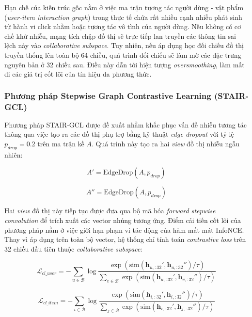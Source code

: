 Hạn chế của kiến trúc gốc nằm ở việc ma trận tương tác người dùng - vật phẩm (\textit{user-item interaction graph}) trong thực tế chứa rất nhiều cạnh nhiễu phát sinh từ hành vi click nhầm hoặc tương tác vô tình của người dùng. Nếu không có cơ chế khử nhiễu, mạng tích chập đồ thị sẽ trực tiếp lan truyền các thông tin sai lệch này vào \textit{collaborative subspace}. Tuy nhiên, nếu áp dụng học đối chiếu đồ thị truyền thống lên toàn bộ 64 chiều, quá trình đối chiếu sẽ làm mờ các đặc trưng nguyên bản ở 32 chiều sau. Điều này dẫn tới hiện tượng \textit{oversmoothing}, làm mất đi các giá trị cốt lõi của tín hiệu đa phương thức.

\subsubsection{Phương pháp Stepwise Graph Contrastive Learning (STAIR-GCL)}

Phương pháp STAIR-GCL được đề xuất nhằm khắc phục vấn đề nhiễu tương tác thông qua việc tạo ra các đồ thị phụ trợ bằng kỹ thuật \textit{edge dropout} với tỷ lệ $p_{drop}=0.2$ trên ma trận kề $A$. Quá trình này tạo ra hai \textit{view} đồ thị nhiễu ngẫu nhiên:

\begin{equation}
A' = \text{EdgeDrop}(A, p_{drop})
\end{equation}

\begin{equation}
A'' = \text{EdgeDrop}(A, p_{drop})
\end{equation}

Hai \textit{view} đồ thị này tiếp tục được đưa qua bộ mã hóa \textit{forward stepwise convolution} để trích xuất các vector nhúng tương ứng. Điểm cải tiến cốt lõi của phương pháp nằm ở việc giới hạn phạm vi tác động của hàm mất mát InfoNCE. Thay vì áp dụng trên toàn bộ vector, hệ thống chỉ tính toán \textit{contrastive loss} trên 32 chiều đầu tiên thuộc \textit{collaborative subspace}:

\begin{equation}
\mathcal{L}_{cl\_user} = -\sum_{u \in \mathcal{B}} \log \frac{\exp(\text{sim}(\mathbf{h}_{u,:32}', \mathbf{h}_{u,:32}'') / \tau)}{\sum_{v \in \mathcal{B}} \exp(\text{sim}(\mathbf{h}_{u,:32}', \mathbf{h}_{v,:32}'') / \tau)}
\end{equation}

\begin{equation}
\mathcal{L}_{cl\_item} = -\sum_{i \in \mathcal{B}} \log \frac{\exp(\text{sim}(\mathbf{h}_{i,:32}', \mathbf{h}_{i,:32}'') / \tau)}{\sum_{j \in \mathcal{B}} \exp(\text{sim}(\mathbf{h}_{i,:32}', \mathbf{h}_{j,:32}'') / \tau)}
\end{equation}

